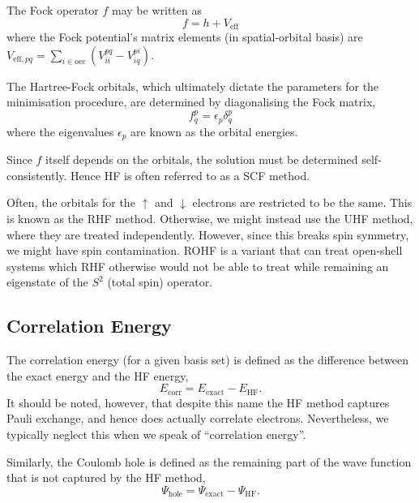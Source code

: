 The Fock operator $f$ may be written as
\begin{equation}
    f = h + V_\mathrm{eff}
\end{equation}
where the Fock potential's matrix elements (in spatial-orbital basis) are $V_{\mathrm{eff},pq}=\sum_{i\in\mathrm{occ}}(V^{pq}_{ii}-V^{pi}_{iq})$.

The Hartree-Fock orbitals, which ultimately dictate the parameters for the minimisation procedure, are determined by diagonalising the Fock matrix,
\begin{equation}
    f^p_{q} = \epsilon_p\delta^p_{q}
\end{equation}
where the eigenvalues $\epsilon_p$ are known as the orbital energies.

Since $f$ itself depends on the orbitals, the solution must be determined self-consistently. Hence \gls{HF} is often referred to as a \gls{SCF} method.

Often, the orbitals for the $\uparrow$ and $\downarrow$ electrons are restricted to be the same. This is known as the \gls{RHF} method. Otherwise, we might instead use the \gls{UHF} method, where they are treated independently. However, since this breaks spin symmetry, we might have spin contamination. \Gls{ROHF} is a variant that can treat open-shell systems which \gls{RHF} otherwise would not be able to treat while remaining an eigenstate of the $S^2$ (total spin) operator.

\subsection{Correlation Energy}

The correlation energy (for a given basis set) is defined as the difference between the exact energy and the \gls{HF} energy,
\begin{equation}
E_\mathrm{corr} = E_\mathrm{exact} - E_\mathrm{HF}.
\end{equation}
It should be noted, however, that despite this name the \gls{HF} method captures Pauli exchange, and hence does actually correlate electrons. Nevertheless, we typically neglect this when we speak of ``correlation energy''.

Similarly, the Coulomb hole is defined as the remaining part of the wave function that is not captured by the \gls{HF} method,
\begin{equation}
    \Psi_\mathrm{hole} = \Psi_\mathrm{exact} - \Psi_\mathrm{HF}.
\end{equation}


